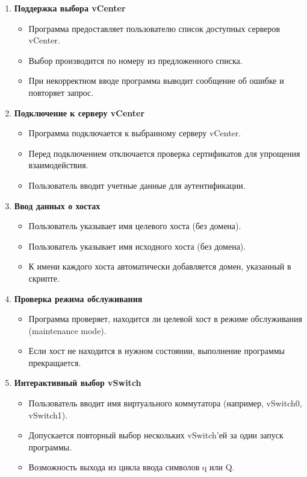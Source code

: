 \begin{enumerate}
    \item \textbf{Поддержка выбора vCenter}
    \begin{itemize}
        \item Программа предоставляет пользователю список доступных серверов vCenter.
        \item Выбор производится по номеру из предложенного списка.
        \item При некорректном вводе программа выводит сообщение об ошибке и повторяет запрос.
    \end{itemize}
    
    \item \textbf{Подключение к серверу vCenter}
    \begin{itemize}
        \item Программа подключается к выбранному серверу vCenter.
        \item Перед подключением отключается проверка сертификатов для упрощения взаимодействия.
        \item Пользователь вводит учетные данные для аутентификации.
    \end{itemize}
    
    \item \textbf{Ввод данных о хостах}
    \begin{itemize}
        \item Пользователь указывает имя целевого хоста (без домена).
        \item Пользователь указывает имя исходного хоста (без домена).
        \item К имени каждого хоста автоматически добавляется домен, указанный в скрипте.
    \end{itemize}
    
    \item \textbf{Проверка режима обслуживания}
    \begin{itemize}
        \item Программа проверяет, находится ли целевой хост в режиме обслуживания (maintenance mode).
        \item Если хост не находится в нужном состоянии, выполнение программы прекращается.
    \end{itemize}
    
    \item \textbf{Интерактивный выбор vSwitch}
    \begin{itemize}
        \item Пользователь вводит имя виртуального коммутатора (например, vSwitch0, vSwitch1).
        \item Допускается повторный выбор нескольких vSwitch'ей за один запуск программы.
        \item Возможность выхода из цикла ввода символов q или Q.
    \end{itemize}
    

\end{enumerate}
